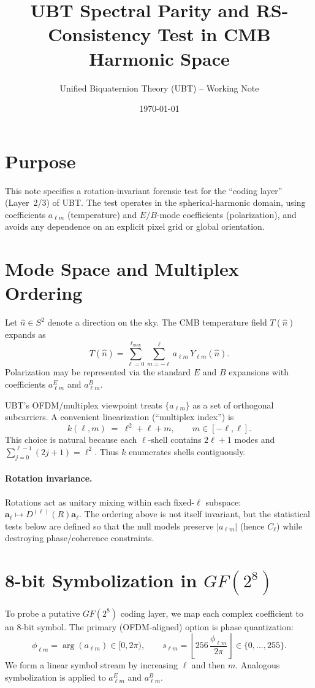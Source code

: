 \documentclass[11pt]{article}
\title{UBT Spectral Parity and RS-Consistency Test in CMB Harmonic Space}
\author{Unified Biquaternion Theory (UBT) -- Working Note}
\date{\today}
\begin{document}
\maketitle

\section{Purpose}
This note specifies a rotation-invariant forensic test for the ``coding layer'' (Layer~2/3) of UBT.
The test operates in the spherical-harmonic domain, using coefficients $a_{\ell m}$ (temperature) and
$E/B$-mode coefficients (polarization), and avoids any dependence on an explicit pixel grid or global orientation.

\section{Mode Space and Multiplex Ordering}
Let $\hat n \in S^2$ denote a direction on the sky. The CMB temperature field $T(\hat n)$ expands as
\begin{equation}
T(\hat n) = \sum_{\ell=0}^{\ell_{\max}} \sum_{m=-\ell}^{\ell} a_{\ell m}\,Y_{\ell m}(\hat n).
\end{equation}
Polarization may be represented via the standard $E$ and $B$ expansions with coefficients $a^{E}_{\ell m}$ and $a^{B}_{\ell m}$.

UBT's OFDM/multiplex viewpoint treats $\{a_{\ell m}\}$ as a set of orthogonal subcarriers.
A convenient linearization (``multiplex index'') is
\begin{equation}
  k(\ell,m) \;=\; \ell^2 + \ell + m, \qquad m\in[-\ell,\ell].
\end{equation}
This choice is natural because each $\ell$-shell contains $2\ell+1$ modes and
$\sum_{j=0}^{\ell-1}(2j+1)=\ell^2$. Thus $k$ enumerates shells contiguously.

\paragraph{Rotation invariance.}
Rotations act as unitary mixing within each fixed-$\ell$ subspace:
$\mathbf{a}_{\ell}\mapsto D^{(\ell)}(R)\mathbf{a}_{\ell}$.
The ordering above is not itself invariant, but the statistical tests below are defined so that the null models preserve
$|a_{\ell m}|$ (hence $C_{\ell}$) while destroying phase/coherence constraints.

\section{8-bit Symbolization in $GF(2^8)$}
To probe a putative $GF(2^8)$ coding layer, we map each complex coefficient to an 8-bit symbol.
The primary (OFDM-aligned) option is phase quantization:
\begin{equation}
  \phi_{\ell m} = \arg(a_{\ell m}) \in [0,2\pi), \qquad
  s_{\ell m} = \left\lfloor 256\,\frac{\phi_{\ell m}}{2\pi} \right\rfloor \in \{0,\dots,255\}.
\end{equation}
We form a linear symbol stream by increasing $\ell$ and then $m$.
Analogous symbolization is applied to $a^{E}_{\ell m}$ and $a^{B}_{\ell m}$.
\end{document}
